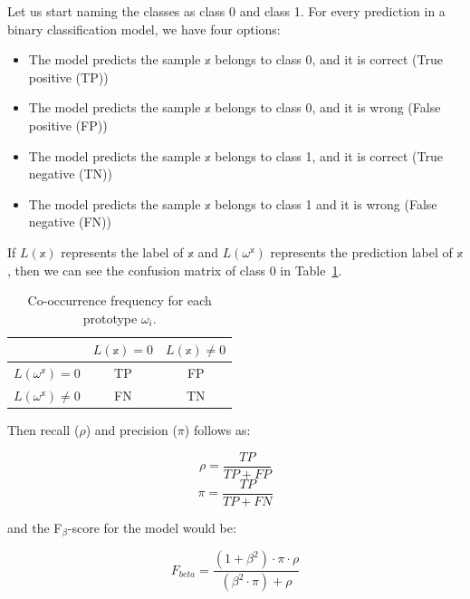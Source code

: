 Let us start naming the classes as class 0 and class 1. For every prediction in a binary classification model, we have four options:

\begin{itemize}
    \item The model predicts the sample $\mathbb{x}$ belongs to class 0, and it is correct (True positive (TP))
    \item The model predicts the sample $\mathbb{x}$ belongs to class 0, and it is wrong (False positive (FP))
    \item The model predicts the sample $\mathbb{x}$ belongs to class 1, and it is correct (True negative (TN))
    \item The model predicts the sample $\mathbb{x}$ belongs to class 1 and it is wrong (False negative (FN))
\end{itemize}

If $L(\mathbb{x})$ represents the label of $\mathbb{x}$ and $L(\omega^{\mathbb{x}})$ represents the prediction label of $\mathbb{x}$, then we can see the confusion matrix of class 0 in Table~\ref{conf matrix}.

\begin{table}[H]
\centering
\begin{tabular}{| c ||c| c| }
\hline
  & $L(\mathbb{x}) = 0 $ & $L(\mathbb{x}) \neq 0$\\[0.5ex]
 \hline\hline
 $L(\omega^{\mathbb{x}}) = 0$ & TP & FP \\
 \hline
 $L(\omega^{\mathbb{x}}) \neq 0$ & FN  & TN \\
 \hline
\end{tabular}
\caption{Co-occurrence frequency for each prototype $\omega_{i}$.}
\label{conf matrix}
\end{table}

Then recall ($\rho$) and precision ($\pi$) follows as:
\vspace{10pt}

\begin{equation}
\rho = \frac{TP}{TP+FP}
\end{equation}
\begin{equation}
\pi = \frac{TP}{TP+FN}
\end{equation}
\vspace{10pt}

and the F$_{\beta}$-score for the model would be:
\vspace{10pt}

\begin{equation}
F_{beta} =  \frac{(1+\beta^{2})\cdot \pi \cdot \rho}{(\beta^{2}\cdot \pi) + \rho}
\end{equation}
\vspace{10pt}


